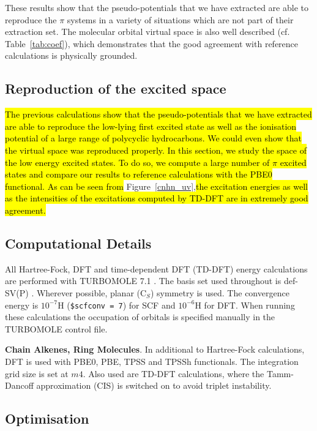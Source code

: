 \documentclass[12pt]{article}
\begin{document}
These results show that the pseudo-potentials that we have extracted are able to reproduce the
$\pi$ systems in a variety of situations which are not part of their extraction set.
The molecular orbital virtual space is also well described (cf. Table~\ref{tab:coef}),
which demonstrates that the good agreement with reference calculations is
physically grounded.

\subsection*{\sffamily \large Reproduction of the excited space}
\hl{The previous calculations show that the pseudo-potentials that we have extracted
are able to reproduce the low-lying first excited state as well as the ionisation potential
of a large range of polycyclic hydrocarbons.
We could even show that the virtual space was reproduced properly.
In this section, we study the space of the low energy excited states.
To do so, we compute a large number of $\pi$ excited states and compare
our results to reference calculations with the PBE0 functional.
As can be seen from }Figure~\ref{cnhn_uv},\hl{the excitation energies as well as the
intensities of the excitations computed by TD-DFT are in extremely good agreement.}

\clearpage

\subsection*{\sffamily \large Computational Details}

All Hartree-Fock, DFT and time-dependent DFT (TD-DFT) energy calculations are performed with TURBOMOLE 7.1 \cite{TURBOMOLE}. The basis set used throughout is def-SV(P) \cite{defsvp}. Wherever possible, planar (C\(_{S}\)) symmetry is used. The convergence energy is \(10^{-7}\)H (\texttt{\$scfconv = 7}) for SCF and \(10^{-6}\)H for DFT. When running these calculations the occupation of orbitals is specified manually in the TURBOMOLE control file.

\textbf{Chain Alkenes, Ring Molecules}. In additional to Hartree-Fock calculations, DFT is used with PBE0, PBE, TPSS and TPSSh functionals. \cite{pbe0,pbe,tpss,tpssh} The integration grid size is set at \(m4\). Also used are TD-DFT calculations, where the Tamm-Dancoff approximation (CIS) \cite{tammdancoff} is switched on to avoid triplet instability.

\subsection*{\sffamily \large Optimisation}
\end{document}
